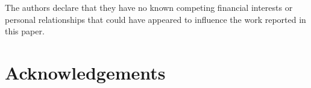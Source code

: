 \documentclass[a4paper,fleqn]{cas-sc}
\begin{document}
The authors declare that they have no known competing financial
interests or personal relationships that could have appeared to
influence the work reported in this paper.

\section*{Acknowledgements}

\printcredits




\end{document}
